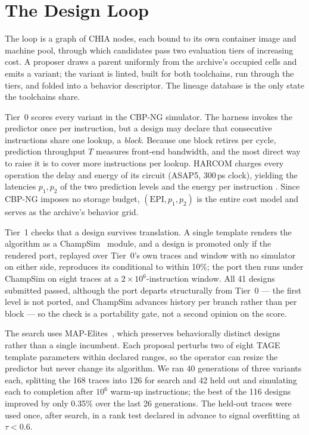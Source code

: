 \documentclass[conference]{IEEEtran}
\newcommand{\mpki}{\text{MPKI}}
\newcommand{\epi}{\text{EPI}}
\begin{document}
\section{The Design Loop}
\label{sec:loop}

The loop is a graph of CHIA nodes, each bound to its own container image and
machine pool, through which candidates pass two evaluation tiers of increasing
cost. A proposer draws a parent uniformly from the archive's occupied cells and
emits a variant; the variant is linted, built for both toolchains, run through
the tiers, and folded into a behavior descriptor. The lineage database is the
only state the toolchains share.

Tier~0 scores every variant in the CBP-NG simulator. The harness invokes the
predictor once per instruction, but a design may declare that consecutive
instructions share one lookup, a \emph{block}. Because one block retires per
cycle, prediction throughput $T$ measures front-end bandwidth, and the most
direct way to raise it is to cover more instructions per lookup. HARCOM charges
every operation the delay and energy of its circuit (ASAP5, 300\,ps clock),
yielding the latencies $p_1,p_2$ of the two prediction levels and the energy per
instruction \epi{}. Since CBP-NG imposes no storage budget, $(\epi{},p_1,p_2)$
is the entire cost model and serves as the archive's behavior grid.

Tier~1 checks that a design survives translation. A single template renders the
algorithm as a ChampSim~\cite{champsim} module, and a design is promoted only if
the rendered port, replayed over Tier~0's own traces and window with no
simulator on either side, reproduces its conditional \mpki{} to within 10\%; the
port then runs under ChampSim on eight traces at a $2\times10^6$-instruction
window. All 41 designs submitted passed, although the port departs structurally
from Tier~0 --- the first level is not ported, and ChampSim advances history per
branch rather than per block --- so the check is a portability gate, not a
second opinion on the score.

The search uses MAP-Elites~\cite{mouret2015illuminating}, which preserves
behaviorally distinct designs rather than a single incumbent. Each proposal
perturbs two of eight TAGE template parameters within declared ranges, so the
operator can resize the predictor but never change its algorithm. We ran 40
generations of three variants each, splitting the 168 traces into 126 for search
and 42 held out and simulating each to completion after $10^6$ warm-up
instructions; the best of the 116 designs improved by only 0.35\% over the last
26 generations. The held-out traces were used once, after search, in a rank
test declared in advance to signal overfitting at $\tau<0.6$.
\end{document}
